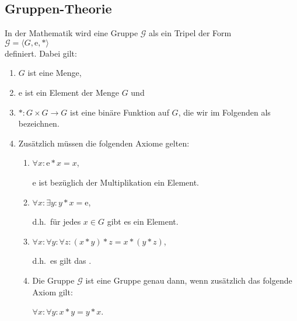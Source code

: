 \subsection{Gruppen-Theorie}
In der Mathematik wird eine Gruppe $\mathcal{G}$ als ein Tripel der Form
\\[0.2cm]
\hspace*{1.3cm}
$\mathcal{G} = \langle G, \mathrm{e}, * \rangle$
\\[0.2cm]
definiert.  Dabei gilt:
\begin{enumerate}
\item $G$ ist eine Menge,
\item $\mathrm{e}$ ist ein Element der Menge $G$ und
\item $*:G \times G \rightarrow G$ ist eine binäre Funktion auf $G$, die wir im Folgenden als
       bezeichnen.
\item Zusätzlich müssen die folgenden Axiome gelten:
      \begin{enumerate}
      \item $\forall x: \mathrm{e} * x = x$,
        
            $\mathrm{e}$ ist bezüglich der Multiplikation ein  Element.
      \item $\forall x: \exists{y}: y * x = \mathrm{e}$,

            d.h.~für jedes $x \in G$ gibt es ein  Element. 
      \item $\forall x: \forall y: \forall z: (x * y) * z = x * (y * z)$,

            d.h.~es gilt das .
      \item Die Gruppe $\mathcal{G}$ ist eine  Gruppe genau dann, wenn zusätzlich das folgende Axiom gilt:
        
            $\forall x: \forall y: x * y = y * x$.
      \end{enumerate}
\end{enumerate}

